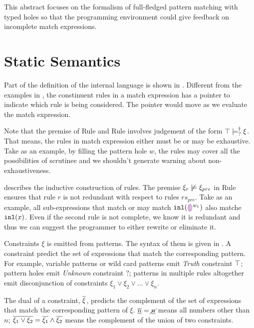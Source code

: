 \documentclass[acmsmall,screen,review,nonacm]{acmart}
\theoremstyle{slplain}
\numberwithin{thm}{section}
\begin{document}
This abstract focuses on the formalism of full-fledged pattern matching with typed holes so that the programming environment could give feedback on incomplete match expressions.

\section{Static Semantics}
\label{sec:statics}



Part of the definition of the internal language is shown in . 
Different from the examples in , the constinuent rules in a match expression has a pointer to indicate which rule is being considered. The pointer would move as we evaluate the match expression.

Note that the premise of Rule \TMatchZPre and Rule \TMatchNZPre involves judgement of the form $\top \models_{?}^{\dag} \xi$. That means, the rules in match expression either must be or may be exhaustive.
Take  as an example, by filling the pattern hole $w$, the rules may cover all the possibilities of scrutinee and we shouldn't generate warning about non-exhaustiveness.



 describes the inductive construction of rules. The premise $\xi_r \not\models \xi_{pre}$ in Rule \TRules ensures that rule $r$ is not redundant with respect to rules $rs_{pre}$.
Take  as an example, all sub-expressions that match or may match $\mathtt{inl}(\textcolor{violet}{\llparenthesis}\textcolor{violet}{\rrparenthesis}^{w_1})$ also matche $\mathtt{inl}(x)$.
Even if the second rule is not complete, we know it is redundant and thus we can suggest the programmer to either rewrite or eliminate it.



Constraints $\xi$ is emitted from patterns. The syntax of them is given in . A constraint predict the set of expressions that match the corresponding pattern.
For example, variable patterns or wild card patterns emit \emph{Truth} constraint $\top$;
pattern holes emit \emph{Unknown} constraint $?$;
patterns in multiple rules altogether emit disconjunction of constraints $\xi_1 \vee \xi_2 \vee \dots \vee \xi_n$.

The dual of a constraint, $\overline{\xi}$, predicts the complement of the set of expressions that match the corresponding pattern of $\xi$.
\eg $\overline{\underline{n}}=\underline{\cancel{n}}$ means all numbers other than $n$;
$\overline{\xi_1 \vee \xi_2}=\overline{\xi_1} \wedge \overline{\xi_2}$ means the complement of the union of two constraints.
\end{document}
